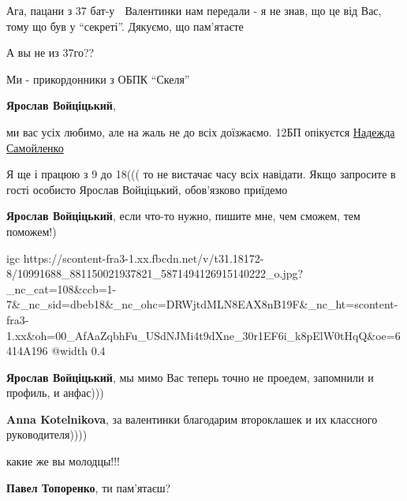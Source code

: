 
Ага, пацани з 37 бат-у 🙂 Валентинки нам передали - я не знав, що це від Вас,
тому що був у \enquote{секреті}. Дякуємо, що пам'ятаєте 🙂


А вы не из 37го??


Ми - прикордонники з ОБПК \enquote{Скеля}

\textbf{Ярослав Войціцький},

ми вас усіх любимо, але на жаль не до всіх доїзжаємо. 12БП опікуєтся \href{https://www.facebook.com/nadia.samoylenko.3}{Надежда Самойленко}


Я ще і працюю з 9 до 18((( то не вистачає часу всіх навідати. Якщо запросите в
гості особисто Ярослав Войціцький, обов'язково приїдемо

\textbf{Ярослав Войціцький}, если что-то нужно, пишите мне, чем сможем, тем поможем!)


\ifcmt
  igc https://scontent-fra3-1.xx.fbcdn.net/v/t31.18172-8/10991688_881150021937821_5871494126915140222_o.jpg?_nc_cat=108&ccb=1-7&_nc_sid=dbeb18&_nc_ohc=DRWjtdMLN8EAX8nB19F&_nc_ht=scontent-fra3-1.xx&oh=00_AfAaZqbhFu_USdNJMi4t9dXne_30r1EF6i_k8pElW0tHqQ&oe=6414A196
	@width 0.4
\fi

\textbf{Ярослав Войціцький}, мы мимо Вас теперь точно не проедем, запомнили и профиль, и анфас)))

\textbf{Anna Kotelnikova}, за валентинки благодарим второклашек и их классного руководителя))))

какие же вы молодцы!!!

\textbf{Павел Топоренко}, ти пам'ятаєш?
